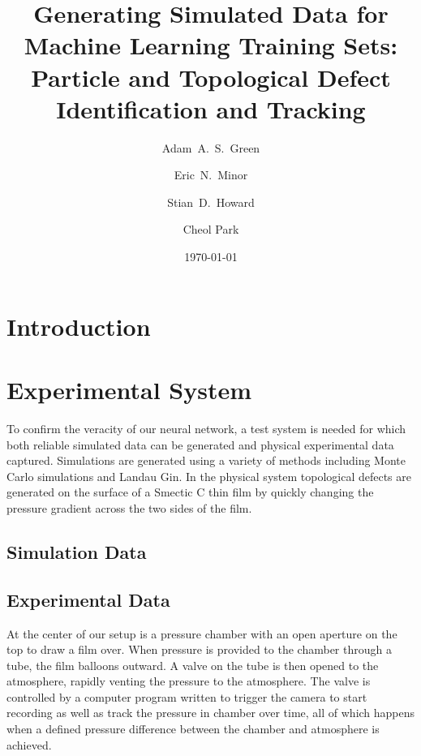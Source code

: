 \documentclass[prl,reprint,showpacs,floatfix,nofootinbib]{revtex4-1}
\begin{document}
\title{Generating Simulated Data for Machine Learning Training Sets: Particle and Topological Defect Identification and Tracking}

\date{\today}
\author{Adam~A.~S.~Green}
\author{Eric~N.~Minor}
\author{Stian~D.~Howard}
\author{Cheol Park}


\begin{abstract}
    \blindtext{}
\end{abstract}

\maketitle

\section{Introduction}
\blindtext{}

\section{Experimental System}

To confirm the veracity of our neural network, a test system is needed for which both reliable simulated data can be generated and physical experimental data captured. Simulations are generated using a variety of methods including Monte Carlo simulations and Landau Gin. In the physical system topological defects are generated on the surface of a Smectic C thin film by quickly changing the pressure gradient across the two sides of the film.

\subsection{Simulation Data}

\subsection{Experimental Data}

At the center of our setup is a pressure chamber with an open aperture on the top to draw a film over. When pressure is provided to the chamber through a tube, the film balloons outward. A valve on the tube is then opened to the atmosphere, rapidly venting the pressure to the atmosphere. The valve is controlled by a computer program written to trigger the camera to start recording as well as track the pressure in chamber over time, all of which happens when a defined pressure difference between the chamber and atmosphere is achieved. 
\end{document}
